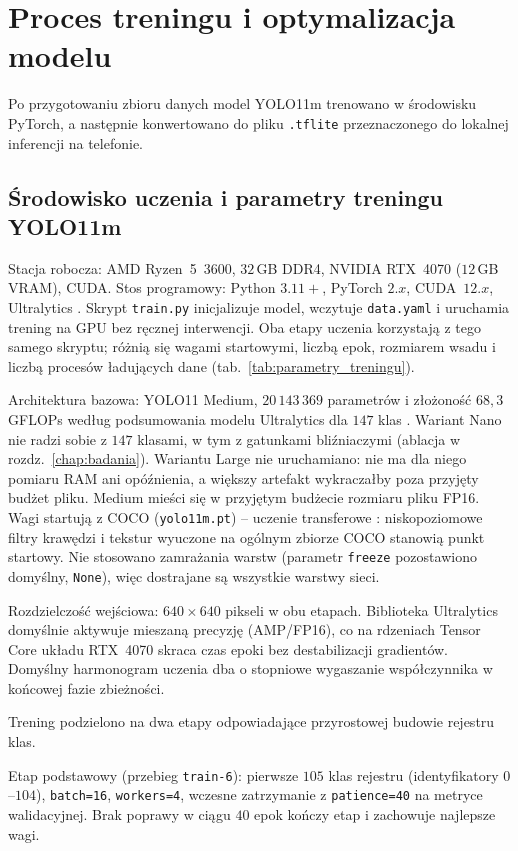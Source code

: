 \section{Proces treningu i optymalizacja modelu}
Po przygotowaniu zbioru danych model YOLO11m trenowano w środowisku PyTorch, a następnie konwertowano do pliku \texttt{.tflite} przeznaczonego do lokalnej inferencji na telefonie.

\subsection{Środowisko uczenia i parametry treningu YOLO11m}
Stacja robocza: AMD Ryzen~5~3600, $32$\,GB DDR4, NVIDIA RTX~4070 ($12$\,GB VRAM), CUDA. Stos programowy: Python $3.11+$, PyTorch $2.x$, CUDA~$12.x$, Ultralytics \cite{pytorch, ultralytics2024yolo11}. Skrypt \texttt{train.py} inicjalizuje model, wczytuje \texttt{data.yaml} i uruchamia trening na GPU bez ręcznej interwencji. Oba etapy uczenia korzystają z tego samego skryptu; różnią się wagami startowymi, liczbą epok, rozmiarem wsadu i liczbą procesów ładujących dane (tab.~\ref{tab:parametry_treningu}).

Architektura bazowa: YOLO11 Medium, $20\,143\,369$ parametrów i złożoność $68{,}3$\,GFLOPs według podsumowania modelu Ultralytics dla $147$ klas \cite{ultralytics2024yolo11}. Wariant Nano nie radzi sobie z $147$ klasami, w tym z gatunkami bliźniaczymi (ablacja w rozdz.~\ref{chap:badania}). Wariantu Large nie uruchamiano: nie ma dla niego pomiaru RAM ani opóźnienia, a większy artefakt wykraczałby poza przyjęty budżet pliku. Medium mieści się w przyjętym budżecie rozmiaru pliku FP16. Wagi startują z COCO (\texttt{yolo11m.pt}) – uczenie transferowe \cite{lin2014coco}: niskopoziomowe filtry krawędzi i tekstur wyuczone na ogólnym zbiorze COCO stanowią punkt startowy. Nie stosowano zamrażania warstw (parametr \texttt{freeze} pozostawiono domyślny, \texttt{None}), więc dostrajane są wszystkie warstwy sieci.

Rozdzielczość wejściowa: $640\times640$ pikseli w obu etapach. Biblioteka Ultralytics domyślnie aktywuje mieszaną precyzję (AMP/FP16), co na rdzeniach Tensor Core układu RTX~4070 skraca czas epoki bez destabilizacji gradientów. Domyślny harmonogram uczenia dba o stopniowe wygaszanie współczynnika w końcowej fazie zbieżności.

Trening podzielono na dwa etapy odpowiadające przyrostowej budowie rejestru klas.

Etap podstawowy (przebieg \texttt{train-6}): pierwsze $105$ klas rejestru (identyfikatory $0$--$104$), \texttt{batch=16}, \texttt{workers=4}, wczesne zatrzymanie z \texttt{patience=40} na metryce walidacyjnej. Brak poprawy w ciągu $40$ epok kończy etap i zachowuje najlepsze wagi.


